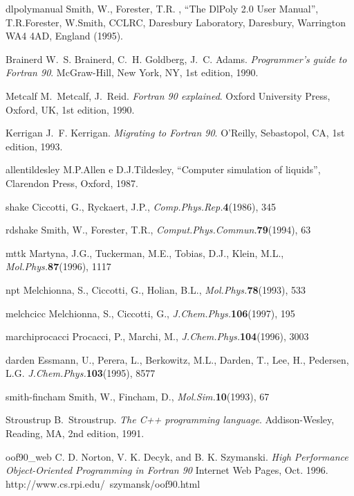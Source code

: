 \bb
{dlpolymanual}
Smith, W., Forester, T.R. , ``The DlPoly 2.0 User Manual'', 
T.R.Forester, W.Smith,
CCLRC, Daresbury Laboratory, Daresbury, Warrington WA4 4AD, England (1995).

\bb
{Brainerd}
W.~S. Brainerd, C.~H. Goldberg, J.~C. Adams.
{\em Programmer's guide to Fortran 90}.
McGraw-Hill, New York, NY, 1st edition, 1990.

\bb
{Metcalf}
M.~Metcalf, J.~Reid.
{\em Fortran 90 explained}.
Oxford University Press, Oxford, UK, 1st edition, 1990.

\bb
{Kerrigan}
J.~F. Kerrigan.
{\em Migrating to Fortran 90}.
O'Reilly, Sebastopol, CA, 1st edition, 1993.

\bb
{allentildesley}
M.P.Allen e D.J.Tildesley, ``Computer simulation of liquids'',
Clarendon Press, Oxford, 1987.

\bb
{shake}
Ciccotti, G., Ryckaert, J.P., 
{\it Comp.Phys.Rep.}{\bf 4}(1986), 345

\bb
{rdshake}
Smith, W., Forester, T.R.,
{\it Comput.Phys.Commun.}{\bf 79}(1994), 63

\bb
{mttk}
Martyna, J.G., Tuckerman, M.E., Tobias, D.J., Klein, M.L.,
{\it Mol.Phys.}{\bf 87}(1996), 1117

\bb
{npt}
Melchionna, S., Ciccotti, G., Holian, B.L.,
{\it Mol.Phys.}{\bf 78}(1993), 533

\bb
{melchcicc}
Melchionna, S., Ciccotti, G., 
{\it J.Chem.Phys.}{\bf 106}(1997), 195

\bb
{marchiprocacci}
Procacci, P., Marchi, M., 
{\it J.Chem.Phys.}{\bf 104}(1996), 3003

\bb
{darden}
Essmann, U., Perera, L., Berkowitz, M.L., Darden, T., 
Lee, H., Pedersen, L.G.
{\it J.Chem.Phys.}{\bf 103}(1995), 8577

\bb
{smith-fincham}
Smith, W., Fincham, D.,
{\it Mol.Sim.}{\bf 10}(1993), 67

\bb
{Stroustrup}
B.~Stroustrup.
{\em The C++ programming language}.
Addison-Wesley, Reading, MA, 2nd edition, 1991.

\bb
{oof90_web}
C. D. Norton, V. K. Decyk, and B. K. Szymanski.
{\em High Performance Object-Oriented Programming in Fortran 90}
Internet Web Pages, Oct. 1996. http://www.cs.rpi.edu/~szymansk/oof90.html
